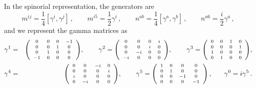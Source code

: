 \documentclass[12pt]{article}
\numberwithin{equation}{section}
\begin{document}
\begin{appendices}
In the spinorial representation, the generators are
\begin{equation}
m^{ij} = \frac{1}{4} [\gamma^i, \gamma^j] \, , \qquad
m^{i5} = \frac{1}{2} \gamma^i \, , \qquad
n^{ab} =  \frac{1}{4} [\gamma^a, \gamma^b] \, , \qquad
n^{a 6} = \frac{i}{2} \gamma^a \, ,
\end{equation}
and we represent the gamma matrices as
\begin{eqnarray*}
\gamma^1&=&{\scriptsize\left(
\begin{array}{cccc}
  0 & 0 & 0 & -1 \\
  0 & 0 & 1 & 0 \\
  0 & 1 & 0 & 0 \\
 -1 & 0 & 0 & 0
\end{array} \right)},\hspace{0.3in}
\gamma^2={\scriptsize\left(
\begin{array}{cccc}
  0 & 0 & 0 & i \\
  0 & 0 & i & 0 \\
  0 & -i & 0 & 0 \\
 -i & 0 & 0 & 0
\end{array} \right)},\hspace{0.3in}
\gamma^3={\scriptsize\left(
\begin{array}{cccc}
  0 & 0 & 1 & 0 \\
  0 & 0 & 0 & 1 \\
  1 & 0 & 0 & 0 \\
  0 & 1 & 0 & 0
\end{array} \right)}, \\
\nonumber \gamma^4&=&{\scriptsize\left(
\begin{array}{cccc}
  0 & 0 & -i & 0 \\
  0 & 0 & 0 & i \\
  i & 0  & 0 & 0\\
  0 & -i & 0 & 0
\end{array} \right)},\hspace{0.25in}~\gamma^5={\scriptsize \left(
\begin{array}{cccc}
  1 & 0 & 0 & 0 \\
  0 & 1 & 0 & 0 \\
  0 & 0 & -1 & 0 \\
   0 & 0 & 0 & -1
\end{array} \right)}\, ,\hspace{0.25in}
\gamma^0= i \gamma^5 \, .
\end{eqnarray*}




\end{appendices}
\end{document}
